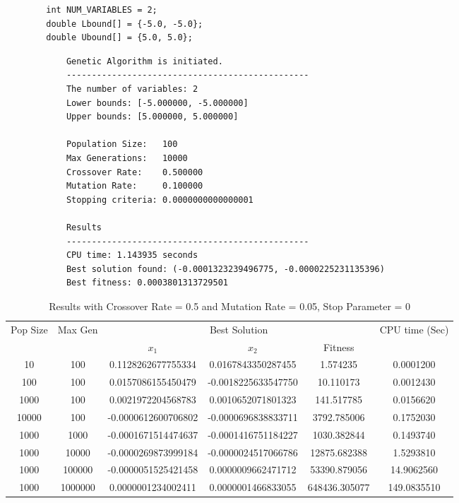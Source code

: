 \documentclass[12pt]{article}
\begin{document}
	\begin{lstlisting}
		int NUM_VARIABLES = 2;
		double Lbound[] = {-5.0, -5.0};
		double Ubound[] = {5.0, 5.0};
	\end{lstlisting}
	
	
	\begin{mdframed}[style=myboxstyleTerminal1]
		\begin{verbatim}
			Genetic Algorithm is initiated.
			------------------------------------------------
			The number of variables: 2
			Lower bounds: [-5.000000, -5.000000]
			Upper bounds: [5.000000, 5.000000]
			
			Population Size:   100
			Max Generations:   10000
			Crossover Rate:    0.500000
			Mutation Rate:     0.100000
			Stopping criteria: 0.0000000000000001
			
			Results
			------------------------------------------------
			CPU time: 1.143935 seconds
			Best solution found: (-0.0001323239496775, -0.0000225231135396)
			Best fitness: 0.0003801313729501
		\end{verbatim}
	\end{mdframed}

    \begin{table}[h!]
        \small
        \caption{Results with Crossover Rate = 0.5 and Mutation Rate = 0.05, Stop Parameter = 0}
        \label{table:1}
        \centering
        \begin{tabular}{c c c c c c}
            \hline
            Pop Size & Max Gen & \multicolumn{3}{c}{Best Solution} & CPU time (Sec) \\
            & & $x_1$ & $x_2$ & Fitness & \\
            \hline
            10    & 100 & 0.1128262677755334  & 0.0167843350287455  & 1.574235    & 0.0001200 \\
            100   & 100 & 0.0157086155450479  & -0.0018225633547750 & 10.110173   & 0.0012430 \\
            1000  & 100 & 0.0021972204568783  & 0.0010652071801323  & 141.517785  & 0.0156620 \\
            10000 & 100 & -0.0000612600706802 & -0.0000696838833711 & 3792.785006 & 0.1752030 \\
            \hline
            1000 & 1000    & -0.0001671514474637 & -0.0001416751184227 & 1030.382844   & 0.1493740 \\
            1000 & 10000   & -0.0000269873999184 & -0.0000024517066786 & 12875.682388  & 1.5293810 \\
            1000 & 100000  & -0.0000051525421458 & 0.0000009662471712  & 53390.879056  & 14.9062560 \\
            1000 & 1000000 & 0.0000001234002411  & 0.0000001466833055  & 648436.305077 & 149.0835510 \\
            \hline
		\end{tabular}
	\end{table}
\end{document}
